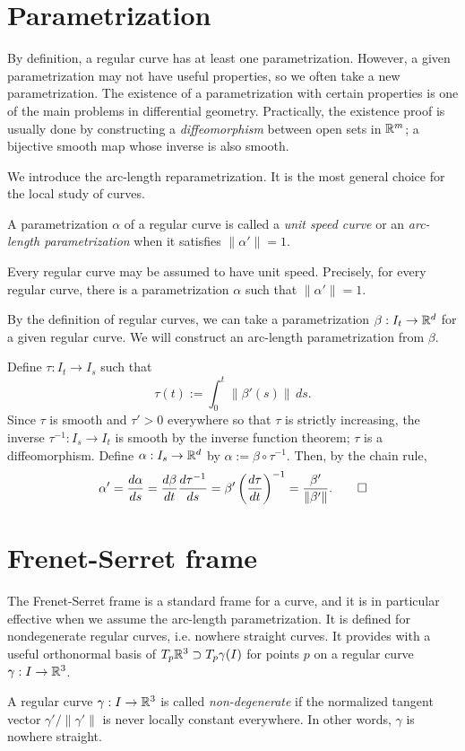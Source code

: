 \documentclass{../../large}
\renewcommand{\a}{\alpha}
\begin{document}
\section{Parametrization}

By definition, a regular curve has at least one parametrization.
However, a given parametrization may not have useful properties, so we often take a new parametrization.
The existence of a parametrization with certain properties is one of the main problems in differential geometry.
Practically, the existence proof is usually done by constructing a \emph{diffeomorphism} between open sets in $\mathbb{R}^m$; a bijective smooth map whose inverse is also smooth.

We introduce the arc-length reparametrization.
It is the most general choice for the local study of curves.
\begin{defn}
A parametrization $\a$ of a regular curve is called a \emph{unit speed curve} or an \emph{arc-length parametrization} when it satisfies $\|\a'\|=1$.
\end{defn}
\begin{thm}
Every regular curve may be assumed to have unit speed.
Precisely, for every regular curve, there is a parametrization $\a$ such that $\|\a'\|=1$.
\end{thm}
\begin{pf}
By the definition of regular curves, we can take a parametrization $\beta:I_t\to\mathbb{R}^d$ for a given regular curve.
We will construct an arc-length parametrization from $\beta$.

Define $\tau:I_t\to I_s$ such that
\[\tau(t):=\int_0^t\|\beta'(s)\|\,ds.\]
Since $\tau$ is smooth and $\tau'>0$ everywhere so that $\tau$ is strictly increasing, the inverse $\tau^{-1}:I_s\to I_t$ is smooth by the inverse function theorem; $\tau$ is a diffeomorphism.
Define $\a:I_s\to\R^d$ by $\a:=\beta\circ\tau^{-1}$.
Then, by the chain rule,
\[\a'=\dd{\a}{s}=\dd{\beta}{t}\dd{\tau^{-1}}{s}=\beta'\left(\dd{\tau}{t}\right)^{-1}=\frac{\beta'}{\|\beta'\|}.\qedhere\]
\end{pf}


\section{Frenet-Serret frame}

The Frenet-Serret frame is a standard frame for a curve, and it is in particular effective when we assume the arc-length parametrization.
It is defined for nondegenerate regular curves, i.e. nowhere straight curves.
It provides with a useful orthonormal basis of $T_p\mathbb{R}^3\supset T_p\gamma(I)$ for points $p$ on a regular curve $\gamma:I\to\mathbb{R}^3$.
\begin{prb}
A regular curve $\gamma:I\to\mathbb{R}^3$ is called \emph{non-degenerate} if the normalized tangent vector $\gamma'/\|\gamma'\|$ is never locally constant everywhere.
In other words, $\gamma$ is nowhere straight.
\end{prb}
\end{document}
